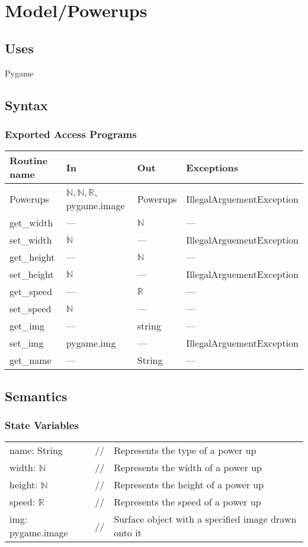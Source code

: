\documentclass[12pt]{article}
\begin{document}
\section*{Model/Powerups}

\subsection* {Uses}

Pygame

\subsection* {Syntax}

\subsubsection* {Exported Access Programs}

\begin{tabular}{| l | l | l | l |}
\hline
\textbf{Routine name} & \textbf{In} & \textbf{Out} & \textbf{Exceptions}\\
\hline
    Powerups & $\mathbb{N, N, R}$, pygame.image & Powerups & IllegalArguementException\\
\hline
    get\_width & --- & $\mathbb{N}$ & ---\\
\hline
    set\_width & $\mathbb{N}$ & --- & IllegalArguementException\\
\hline
    get\_height & --- & $\mathbb{N}$ & ---\\
\hline
    set\_height & $\mathbb{N}$ & --- & IllegalArguementException\\
\hline
    get\_speed & --- & $\mathbb{R}$ & --- \\
\hline
    set\_speed & $\mathbb{N}$ & ---& --- \\
\hline
    get\_img & --- & string & ---\\
\hline
    set\_img & pygame.img & --- & IllegalArguementException\\
\hline
    get\_name & --- & String & --- \\
\hline
\end{tabular}

\subsection* {Semantics}

\subsubsection* {State Variables}
\begin{tabular}{lll}
name: String & // & Represents the type of a power up\\
    width: $\mathbb{N}$ & // & Represents the width of a power up\\
    height: $\mathbb{N}$ & // & Represents the height of a power up\\
    speed: $\mathbb{R}$ & // & Represents the speed of a power up\\
    img: pygame.image & // & Surface object with a specified image drawn onto it\\
\end{tabular}
\end{document}
